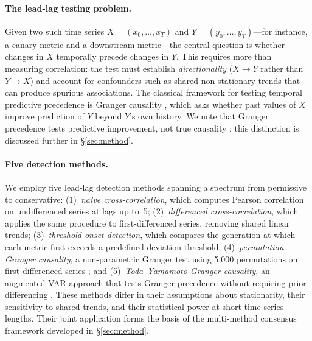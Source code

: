 \paragraph{The lead-lag testing problem.}
Given two such time series $X = (x_0, \ldots, x_T)$ and $Y = (y_0, \ldots, y_T)$---for instance, a canary metric and a downstream metric---the central question is whether changes in $X$ temporally precede changes in $Y$.
This requires more than measuring correlation: the test must establish \emph{directionality} ($X \to Y$ rather than $Y \to X$) and account for confounders such as shared non-stationary trends that can produce spurious associations.
The classical framework for testing temporal predictive precedence is Granger causality \cite{granger1969investigating}, which asks whether past values of $X$ improve prediction of $Y$ beyond $Y$'s own history.
We note that Granger precedence tests predictive improvement, not true causality \cite{shojaie2022granger}; this distinction is discussed further in \S\ref{sec:method}.

\paragraph{Five detection methods.}
We employ five lead-lag detection methods spanning a spectrum from permissive to conservative:
(1)~\emph{naive cross-correlation}, which computes Pearson correlation on undifferenced series at lags up to~5;
(2)~\emph{differenced cross-correlation}, which applies the same procedure to first-differenced series, removing shared linear trends;
(3)~\emph{threshold onset detection}, which compares the generation at which each metric first exceeds a predefined deviation threshold;
(4)~\emph{permutation Granger causality}, a non-parametric Granger test using 5{,}000 permutations on first-differenced series \cite{shojaie2022granger}; and
(5)~\emph{Toda--Yamamoto Granger causality}, an augmented VAR approach that tests Granger precedence without requiring prior differencing \cite{granger1969investigating}.
These methods differ in their assumptions about stationarity, their sensitivity to shared trends, and their statistical power at short time-series lengths.
Their joint application forms the basis of the multi-method consensus framework developed in \S\ref{sec:method}.